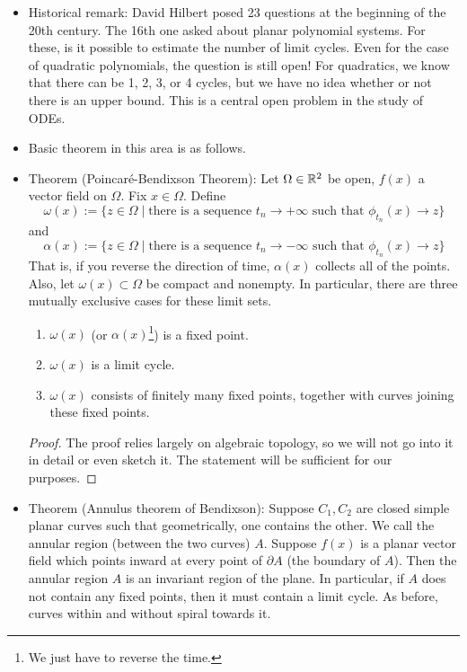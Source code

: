 \documentclass[../notes.tex]{subfiles}
\begin{document}
\begin{itemize}
    \item Historical remark: David Hilbert posed 23 questions at the beginning of the 20th century. The 16th one asked about planar polynomial systems. For these, is it possible to estimate the number of limit cycles. Even for the case of quadratic polynomials, the question is still open! For quadratics, we know that there can be 1, 2, 3, or 4 cycles, but we have no idea whether or not there is an upper bound. This is a central open problem in the study of ODEs.
    \item Basic theorem in this area is as follows.
    \item Theorem (Poincar\'{e}-Bendixson Theorem): Let $\Omega\in\mathbb{R}^2$ be open, $f(x)$ a vector field on $\Omega$. Fix $x\in\Omega$. Define
    \begin{equation*}
        \omega(x) := \{z\in\Omega\mid\text{there is a sequence }t_n\to +\infty\text{ such that }\phi_{t_n}(x)\to z\}
    \end{equation*}
    and
    \begin{equation*}
        \alpha(x) := \{z\in\Omega\mid\text{there is a sequence }t_n\to -\infty\text{ such that }\phi_{t_n}(x)\to z\}
    \end{equation*}
    That is, if you reverse the direction of time, $\alpha(x)$ collects all of the points. Also, let $\omega(x)\subset\Omega$ be compact and nonempty. In particular, there are three mutually exclusive cases for these limit sets.
    \begin{enumerate}
        \item $\omega(x)$ (or $\alpha(x)$\footnote{We just have to reverse the time.}) is a fixed point.
        \item $\omega(x)$ is a limit cycle.
        \item $\omega(x)$ consists of finitely many fixed points, together with curves joining these fixed points.
    \end{enumerate}
    \begin{proof}
        The proof relies largely on algebraic topology, so we will not go into it in detail or even sketch it. The statement will be sufficient for our purposes.
    \end{proof}
    \item Theorem (Annulus theorem of Bendixson): Suppose $C_1,C_2$ are closed simple planar curves such that geometrically, one contains the other. We call the annular region (between the two curves) $A$. Suppose $f(x)$ is a planar vector field which points inward at every point of $\partial A$ (the boundary of $A$). Then the annular region $A$ is an invariant region of the plane. In particular, if $A$ does not contain any fixed points, then it must contain a limit cycle. As before, curves within and without spiral towards it.

\end{itemize}
\end{document}
